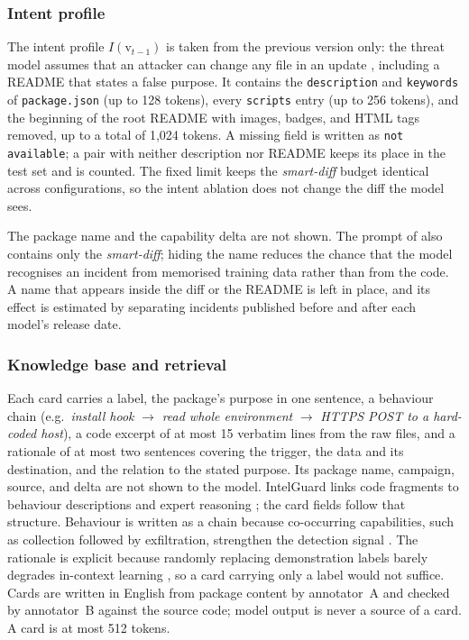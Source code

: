 \documentclass[a4paper,fleqn]{cas-dc}
\begin{document}
\subsubsection{Intent profile}\label{sec:intent}

The intent profile $I(\mathrm{v}_{t-1})$ is taken from the previous version
only: the threat model assumes that an attacker can change any file in an
update \citep{wyss2025evaluating}, including a README that states a false
purpose. It contains the \texttt{description} and \texttt{keywords} of
\texttt{package.json} (up to 128 tokens), every \texttt{scripts} entry (up to
256 tokens), and the beginning of the root README with images, badges, and
HTML tags removed, up to a total of 1{,}024 tokens. A missing field is written
as \texttt{not available}; a pair with neither description nor README keeps
its place in the test set and is counted. The fixed limit keeps the
\emph{smart-diff} budget identical across configurations, so the intent
ablation does not change the diff the model sees.

The package name and the capability delta are not shown. The prompt of
\citet{wyss2025evaluating} also contains only the \emph{smart-diff}; hiding the
name reduces the chance that the model recognises an incident from memorised
training data rather than from the code. A name that appears inside the diff
or the README is left in place, and its effect is estimated by separating
incidents published before and after each model's release date.

\subsubsection{Knowledge base and retrieval}\label{sec:retrieval}

Each card carries a label, the package's purpose in one sentence, a behaviour
chain (e.g.\ \emph{install hook} $\rightarrow$ \emph{read whole environment}
$\rightarrow$ \emph{HTTPS POST to a hard-coded host}), a code excerpt of at
most 15 verbatim lines from the raw files, and a rationale of at most two
sentences covering the trigger, the data and its destination, and the
relation to the stated purpose. Its package name, campaign, source, and delta
are not shown to the model. IntelGuard links code fragments to behaviour
descriptions and expert reasoning \citep{guo2026bridging}; the card fields
follow that structure. Behaviour is written as a chain because co-occurring
capabilities, such as collection followed by exfiltration, strengthen the
detection signal \citep{guo2026effective}. The rationale is explicit because
randomly replacing demonstration labels barely degrades in-context learning
\citep{min2022rethinking}, so a card carrying only a label would not suffice.
Cards are written in English from package content by annotator~A and checked
by annotator~B against the source code; model output is never a source of a
card. A card is at most 512 tokens.
\end{document}
